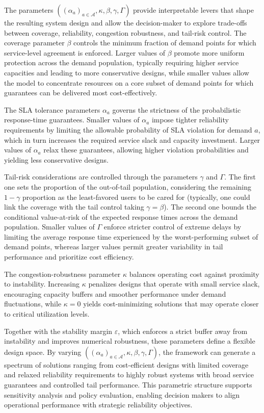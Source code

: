 \documentclass[letter,11pt, reqno]{amsart}
\def\A{\mathcal{A}}
\begin{document}
The parameters $((\alpha_a)_{a\in \A},\kappa,\beta,\gamma,\Gamma)$ provide interpretable levers that
shape the resulting system design and allow the decision-maker to explore
trade-offs between coverage, reliability, congestion robustness, and tail-risk
control. The coverage parameter $\beta$ controls the minimum fraction of demand
points for which service-level agreement is enforced. Larger values of $\beta$
promote more uniform protection across the demand population, typically requiring
higher service capacities and leading to more conservative designs, while smaller
values allow the model to concentrate resources on a core subset of demand points
for which guarantees can be delivered most cost-effectively.

The SLA tolerance parameters $\alpha_a$ governs the strictness of the probabilistic
response-time guarantees. Smaller values of $\alpha_a$ impose tighter reliability
requirements by limiting the allowable probability of SLA violation for demand $a$, which in
turn increases the required service slack and capacity investment. Larger values
of $\alpha_a$ relax these guarantees, allowing higher violation probabilities and
yielding less conservative designs.

Tail-risk considerations are controlled through the parameters $\gamma$ and $\Gamma$. The first one sets the proportion of the out-of-tail population, considering the remaining $1-\gamma$ proportion as the least-favored users to be cared for (typically, one could link the coverage with the tail control taking $\gamma=\beta$). The second one bounds the conditional value-at-risk of the expected response times across the
demand population. Smaller values of $\Gamma$ enforce stricter control of extreme
delays by limiting the average response time experienced by the worst-performing
subset of demand points, whereas larger values permit greater variability in tail
performance and prioritize cost efficiency.

The congestion-robustness parameter $\kappa$ balances operating cost against
proximity to instability. Increasing $\kappa$ penalizes designs that operate with
small service slack, encouraging capacity buffers and smoother performance under
demand fluctuations, while $\kappa=0$ yields cost-minimizing solutions that may
operate closer to critical utilization levels.

Together with the stability margin $\varepsilon$, which enforces a strict buffer
away from instability and improves numerical robustness, these parameters define
a flexible design space. By varying $((\alpha_a)_{a\in \A},\kappa,\beta,\gamma,\Gamma)$, the framework
can generate a spectrum of solutions ranging from cost-efficient designs with
limited coverage and relaxed reliability requirements to highly robust systems
with broad service guarantees and controlled tail performance. This parametric
structure supports sensitivity analysis and policy evaluation, enabling decision
makers to align operational performance with strategic reliability objectives.
\end{document}
